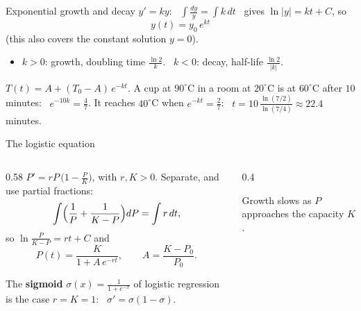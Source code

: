 \documentclass[10pt]{wosm-slides}
\begin{document}
\begin{frame}{Exponential growth and decay}
  $y' = ky$: \ $\displaystyle \int \frac{dy}{y} = \int k\, dt$ \ gives $\ln|y| = kt + C$, so
  \[ y(t) = y_0\, e^{kt} \]
  (this also covers the constant solution $y = 0$).
  \pause
  \begin{itemize}
    \item $k > 0$: growth, doubling time $\frac{\ln 2}{k}$. \ $k < 0$: decay, half-life $\frac{\ln 2}{|k|}$.
  \end{itemize}
  \pause
  \begin{example}[Newton's law of cooling, $T' = -k(T - A)$]
    $T(t) = A + (T_0 - A)\, e^{-kt}$. A cup at $90^\circ$C in a room at $20^\circ$C is at $60^\circ$C
    after $10$ minutes: \ $e^{-10k} = \frac47$. It reaches $40^\circ$C when $e^{-kt} = \frac27$:
    \ $t = 10\, \frac{\ln(7/2)}{\ln(7/4)} \approx 22.4$ minutes.
  \end{example}
\end{frame}

\begin{frame}{The logistic equation}
  \begin{columns}[c]
    \begin{column}{0.58\textwidth}
      $P' = rP\,\bigl(1 - \frac PK\bigr)$, with $r, K > 0$. Separate, and use partial fractions:
      \[ \int \Bigl(\frac1P + \frac{1}{K - P}\Bigr) dP = \int r\, dt , \]
      \pause
      so $\ln\frac{P}{K - P} = rt + C$ and
      \[ P(t) = \frac{K}{1 + A\, e^{-rt}}, \qquad A = \frac{K - P_0}{P_0} . \]
      \pause
      {\small The \textbf{sigmoid} $\sigma(x) = \frac{1}{1 + e^{-x}}$ of logistic regression is the case
      $r = K = 1$: \ $\sigma' = \sigma(1 - \sigma)$.\par}
    \end{column}
    \begin{column}{0.4\textwidth}
      \centering
      \par\small Growth slows as $P$ approaches the capacity $K$.
    \end{column}
  \end{columns}
\end{frame}
\end{document}
